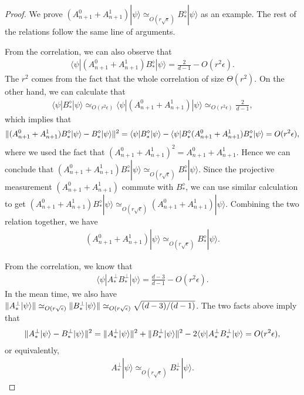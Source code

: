 \documentclass[11pt,letterpaper]{article}
\newcommand{\ket}[1]{|#1\rangle}
\newcommand{\bra}[1]{\langle#1|}
\DeclarePairedDelimiter{\norm}{\lVert}{\rVert}
\newcommand{\1}{\mathbb{1}}
\newcommand{\ep}{\epsilon}
\newcommand{\se}{\sqrt{\epsilon}}
\newcommand{\appd}[1]{\simeq_{#1}}
\theoremstyle{definition}
\begin{document}
\begin{proof} 
We prove $(A_{n+1}^0+A_{n+1}^1)\ket{\psi} \appd{O(r\se)} B_\ast^\diamond \ket{\psi}$ as an example.
The rest of the relations follow the same line of arguments.

From the correlation, we can also observe that
\begin{align}
 \bra{\psi} (A_{n+1}^0+A_{n+1}^1)B_\ast^\diamond \ket{\psi} = \frac{2}{d-1} - O(r^2 \epsilon).
\end{align}
The $r^2$ comes from the fact that the whole correlation of size $\Theta(r^2)$.
On the other hand, we can calculate that 
\begin{align}
	\bra{\psi} B_\ast^\diamond \ket{\psi} \appd{O(r^2\epsilon)} 
 \bra{\psi}(A_{n+1}^0+A_{n+1}^1)\ket{\psi} \appd{O(r^2\epsilon)} \frac{2}{d-1},
\end{align}
which implies that 
\begin{align}
	\norm{(A_{n+1}^0 + A_{n+1}^1)B_\ast^\diamond \ket{\psi} - B_\ast^\diamond\ket{\psi}}^2 
	= \bra{\psi} B_\ast^\diamond \ket{\psi} - \bra{\psi}B_\ast^\diamond(A_{n+1}^0 + A_{n+1}^1)B_\ast^\diamond \ket{\psi}
	= O(r^2 \epsilon),
\end{align}
where we used the fact that $(A_{n+1}^0 + A_{n+1}^1)^2 = A_{n+1}^0 + A_{n+1}^1$.
Hence we can conclude that $(A_{n+1}^0 + A_{n+1}^1)B_\ast^\diamond \ket{\psi} \appd{O(r\se)} B_\ast^\diamond\ket{\psi}$.
Since the projective measurement $(A_{n+1}^0+A_{n+1}^1)$ commute with $B_\ast^\diamond$, we can use similar calculation to get
$(A_{n+1}^0 + A_{n+1}^1)B_\ast^\diamond \ket{\psi} \appd{O(r\se)} (A_{n+1}^0 + A_{n+1}^1)\ket{\psi}$.
Combining the two relation together, we have
\begin{align}
	(A_{n+1}^0 + A_{n+1}^1) \ket{\psi} \appd{O(r\se)} B_\ast^\diamond \ket{\psi}.
\end{align}

From the correlation, we know that 
\begin{align}
	\bra{\psi} A_\ast^\perp B_\ast^\perp \ket{\psi} = \frac{d-3}{d-1} - O(r^2 \ep).
\end{align}
In the mean time, we also have 
$\norm{A_\ast^\perp \ket{\psi}} \appd{O(r\se)} \norm{B_\ast^\perp\ket{\psi}} \appd{O(r\se)} \sqrt{(d-3)/(d-1)}$.
The two facts above imply that 
\begin{align}
	\norm{A_\ast^\perp \ket{\psi} - B_\ast^\perp \ket{\psi}}^2 = \norm{A_\ast^\perp \ket{\psi}}^2 + \norm{B_\ast^\perp \ket{\psi}}^2
	- 2 \bra{\psi} A_\ast^\perp B_\ast^\perp \ket{\psi}  = O(r^2 \ep),
\end{align}
or equivalently,
\begin{align}
	A_\ast^\perp \ket{\psi} \appd{O(r\se)} B_\ast^\perp \ket{\psi}.
\end{align}
\end{proof}
\end{document}

